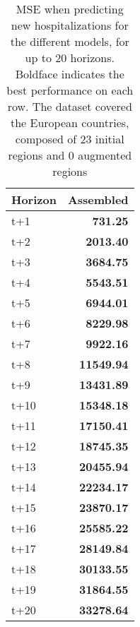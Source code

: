 \begin{table}[H]
\centering
\caption{MSE when predicting new hospitalizations for the different models, for up to 20 horizons. Boldface indicates the best performance on each row. The dataset covered the European countries, composed of 23 initial regions and 0 augmented regions }
\label{tab:MSE_comparison}
\begin{tabular}{lr}
\toprule
Horizon &  Assembled \\
\midrule
t+1  & \textbf{731.25}  \\
t+2  & \textbf{2013.40}  \\
t+3  & \textbf{3684.75}  \\
t+4  & \textbf{5543.51}  \\
t+5  & \textbf{6944.01}  \\
t+6  & \textbf{8229.98}  \\
t+7  & \textbf{9922.16}  \\
t+8  & \textbf{11549.94}  \\
t+9  & \textbf{13431.89}  \\
t+10  & \textbf{15348.18}  \\
t+11  & \textbf{17150.41}  \\
t+12  & \textbf{18745.35}  \\
t+13  & \textbf{20455.94}  \\
t+14  & \textbf{22234.17}  \\
t+15  & \textbf{23870.17}  \\
t+16  & \textbf{25585.22}  \\
t+17  & \textbf{28149.84}  \\
t+18  & \textbf{30133.55}  \\
t+19  & \textbf{31864.55}  \\
t+20  & \textbf{33278.64}  \\

\bottomrule
\end{tabular}
\end{table}
